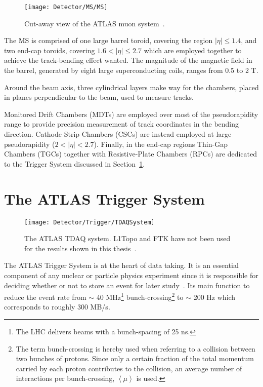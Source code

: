 			\begin{figure}[!htb]
				\centering
				\texttt{[image: Detector/MS/MS]}
				\caption{Cut-away view of the ATLAS muon system~\cite{ATLASJINST}.}
				\label{fig:MS}
			\end{figure}

			The MS is comprised of one large barrel toroid, covering the region $\left| \eta \right | \leq 1.4$, and two end-cap toroids, covering $1.6 < \left| \eta \right| \leq 2.7$ which are employed together to achieve the track-bending effect wanted. The magnitude of the magnetic field in the barrel, generated by eight large superconducting coils, ranges from 0.5 to 2 T. 

			Around the beam axis, three cylindrical layers make way for the chambers, placed in planes perpendicular to the beam, used to measure tracks. 

			Monitored Drift Chambers (MDTs) are employed over most of the pseudorapidity range to provide precision measurement of track coordinates in the bending direction. 
			Cathode Strip Chambers (CSCs) are instead employed at large pseudorapidity ($2 < \left | \eta \right | < 2.7$). 
			Finally, in the end-cap regions Thin-Gap Chambers (TGCs) together with Resistive-Plate Chambers (RPCs) are dedicated to the Trigger System discussed in Section~\ref{sec:trigSyst}. 


	\section{The ATLAS Trigger System}
	\label{sec:trigSyst}

		\begin{figure}[!htb]
			\centering
			\texttt{[image: Detector/Trigger/TDAQSystem]}
			\caption{The ATLAS TDAQ system. L1Topo and FTK have not been used for the results shown in this thesis~\cite{ATLASTrigger2015}.}
			\label{fig:TDAQSyst}
		\end{figure}

		The ATLAS Trigger System is at the heart of data taking. It is an essential component of any nuclear or particle physics experiment since it is responsible for deciding whether or not to store an event for later study~\cite{ATLASTrigger2015}. Its main function to reduce the event rate from $\sim$ 40 MHz\footnote{The LHC delivers beams with a bunch-spacing of 25 ns.} bunch-crossing\footnote{The term bunch-crossing is hereby used when referring to a collision between two bunches of protons. Since only a certain fraction of the total momentum carried by each proton contributes to the collision, an average number of interactions per bunch-crossing, $\left < \mu \right >$ is used.} to $\sim$ 200 Hz which corresponds to roughly 300 MB/s.

